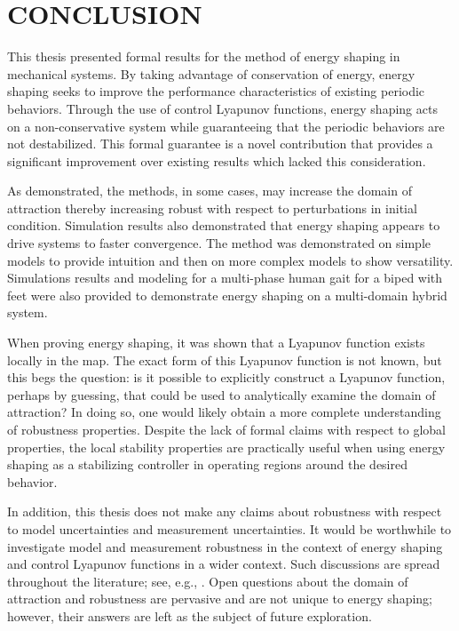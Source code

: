 \chapter{\uppercase{Conclusion}}

This thesis presented formal results for the method of energy shaping in
mechanical systems.
%
By taking advantage of conservation of energy, energy shaping seeks to improve
the performance characteristics of existing periodic behaviors.
%
Through the use of control Lyapunov functions, energy shaping acts on a
non-conservative system while guaranteeing that the periodic behaviors are not
destabilized.
%
This formal guarantee is a novel contribution that provides a significant
improvement over existing results which lacked this consideration.


As demonstrated, the methods, in some cases, may increase the domain of
attraction thereby increasing robust with respect to perturbations in initial
condition.
%
Simulation results also demonstrated that energy shaping appears to drive
systems to faster convergence.
%
The method was demonstrated on simple models to provide intuition and then on
more complex models to show versatility.
%
Simulations results and modeling for a multi-phase human gait for a biped with
feet were also provided to demonstrate energy shaping on a multi-domain hybrid
system.


When proving energy shaping, it was shown that a Lyapunov function exists
locally in the \Poincare{} map.
%
The exact form of this Lyapunov function is not known, but this begs the
question:
%
is it possible to explicitly construct a Lyapunov function, perhaps by guessing,
that could be used to analytically examine the domain of attraction?
%
In doing so, one would likely obtain a more complete understanding of robustness
properties.
%
Despite the lack of formal claims with respect to global properties, the local
stability properties are practically useful when using energy shaping as a
stabilizing controller in operating regions around the desired behavior.


In addition, this thesis does not make any claims about robustness with respect
to model uncertainties and measurement uncertainties.
%
It would be worthwhile to investigate model and measurement robustness in the
context of energy shaping and control Lyapunov functions in a wider context.
%
Such discussions are spread throughout the literature; see, e.g.,
\cite{Freeman1996}.
%
Open questions about the domain of attraction and robustness are pervasive and
are not unique to energy shaping;
%
however, their answers are left as the subject of future exploration.


